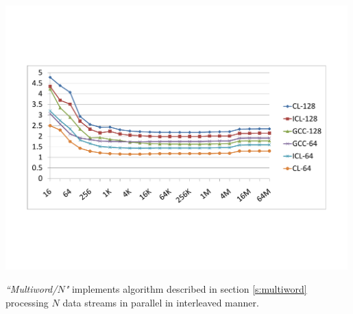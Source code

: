 \documentclass{article}
\begin{document}
\begin{table}
\begin{center}
\includegraphics[trim=14.25mm 50mm 16.75mm 50mm, width=0.99\textwidth]{CompilerComparison.pdf} \label{f:CompilerComparison}
\end{center}

{\it``Multiword/$N$"} implements algorithm described in section
\ref{s:multiword} processing $N$ data streams in parallel in interleaved
manner.


\end{table}
\end{document}
